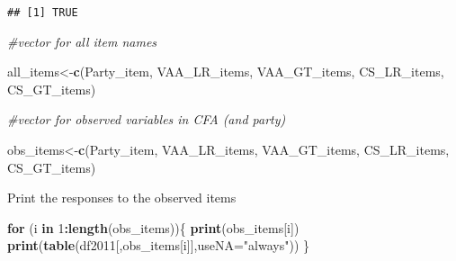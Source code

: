 \documentclass[
]{article}
\newenvironment{Shaded}{\begin{snugshade}}{\end{snugshade}}
\newcommand{\CommentTok}[1]{\textcolor[rgb]{0.56,0.35,0.01}{\textit{#1}}}
\newcommand{\ControlFlowTok}[1]{\textcolor[rgb]{0.13,0.29,0.53}{\textbf{#1}}}
\newcommand{\DataTypeTok}[1]{\textcolor[rgb]{0.13,0.29,0.53}{#1}}
\newcommand{\DecValTok}[1]{\textcolor[rgb]{0.00,0.00,0.81}{#1}}
\newcommand{\KeywordTok}[1]{\textcolor[rgb]{0.13,0.29,0.53}{\textbf{#1}}}
\newcommand{\NormalTok}[1]{#1}
\newcommand{\OperatorTok}[1]{\textcolor[rgb]{0.81,0.36,0.00}{\textbf{#1}}}
\newcommand{\StringTok}[1]{\textcolor[rgb]{0.31,0.60,0.02}{#1}}
\begin{document}
\begin{verbatim}
## [1] TRUE
\end{verbatim}

\begin{Shaded}
\begin{Highlighting}[]
\CommentTok{#vector for all item names}

\NormalTok{all_items<-}\KeywordTok{c}\NormalTok{(Party_item,}
\NormalTok{             VAA_LR_items,}
\NormalTok{             VAA_GT_items,}
\NormalTok{             CS_LR_items,}
\NormalTok{             CS_GT_items)}

\CommentTok{#vector for observed variables in CFA (and party)}

\NormalTok{obs_items<-}\KeywordTok{c}\NormalTok{(Party_item,}
\NormalTok{             VAA_LR_items,}
\NormalTok{             VAA_GT_items,}
\NormalTok{             CS_LR_items,}
\NormalTok{             CS_GT_items)}
\end{Highlighting}
\end{Shaded}

Print the responses to the observed items

\begin{Shaded}
\begin{Highlighting}[]
\ControlFlowTok{for}\NormalTok{ (i }\ControlFlowTok{in} \DecValTok{1}\OperatorTok{:}\KeywordTok{length}\NormalTok{(obs_items))\{}
  \KeywordTok{print}\NormalTok{(obs_items[i])}
  \KeywordTok{print}\NormalTok{(}\KeywordTok{table}\NormalTok{(df2011[,obs_items[i]],}\DataTypeTok{useNA=}\StringTok{"always"}\NormalTok{))}
\NormalTok{  \}}
\end{Highlighting}
\end{Shaded}
\end{document}
